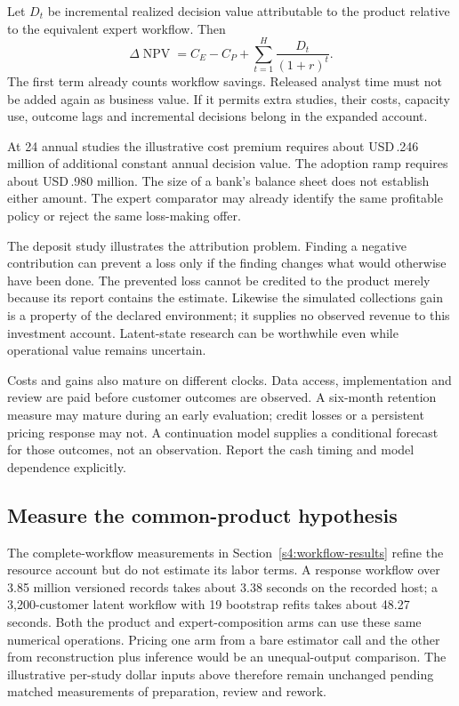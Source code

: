 Let $D_t$ be incremental realized decision value attributable to the
product relative to the equivalent expert workflow. Then
\begin{equation}
 \Delta\operatorname{NPV}
 =C_E-C_P+\sum_{t=1}^{H}\frac{D_t}{(1+r)^t}.
 \label{r3:incremental-npv}
\end{equation}
The first term already counts workflow savings. Released analyst time
must not be added again as business value. If it permits extra studies,
their costs, capacity use, outcome lags and incremental decisions
belong in the expanded account.

At 24 annual studies the illustrative cost premium requires about
USD\,.246 million of additional constant annual decision value.
The adoption ramp requires about USD\,.980 million. The size of a
bank's balance sheet does not establish either amount. The expert
comparator may already identify the same profitable policy or reject
the same loss-making offer.

The deposit study illustrates the attribution problem. Finding a
negative contribution can prevent a loss only if the finding changes
what would otherwise have been done. The prevented loss cannot be
credited to the product merely because its report contains the estimate.
Likewise the simulated collections gain is a property of the declared
environment; it supplies no observed revenue to this investment account.
Latent-state research can be worthwhile even while operational value
remains uncertain.

Costs and gains also mature on different clocks. Data access,
implementation and review are paid before customer outcomes are
observed. A six-month retention measure may mature during an early
evaluation; credit losses or a persistent pricing response may not.
A continuation model supplies a conditional forecast for those outcomes,
not an observation. Report the cash timing and model dependence explicitly.

\subsection{Measure the common-product hypothesis}
\label{r3:adoption-experiment}

The complete-workflow measurements in Section~\ref{s4:workflow-results}
refine the resource account but do not estimate its labor terms. A response
workflow over 3.85 million versioned records takes about 3.38 seconds on the
recorded host; a 3,200-customer latent workflow with 19 bootstrap refits takes
about 48.27 seconds. Both the product and expert-composition arms can use
these same numerical operations. Pricing one arm from a bare estimator call
and the other from reconstruction plus inference would be an unequal-output
comparison. The illustrative per-study dollar inputs above therefore remain
unchanged pending matched measurements of preparation, review and rework.

